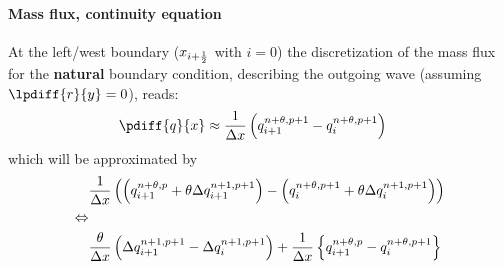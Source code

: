 \paragraph*{Mass flux, continuity equation}
At the left/west boundary ($x_{i+\frac{1}{2}}$ with $i=0$) the discretization of the mass flux for the \textbf{natural} boundary condition, describing the outgoing wave (assuming $\lpdiff{r}{y} = 0$), reads:
\begin{align}
    \pdiff{q}{x} & \approx \frac{1}{\Dx} \left(  q^{n+\theta, p+1}_{i+1} - q^{n+\theta, p+1}_{i} \right)
\end{align}
which will be approximated by
\begin{align}
    &\frac{1}{\Delta x} \left( \left( q^{n+\theta, p}_{i+1} + \theta \Delta q^{n+1, p+1}_{i+1}\right)
    - \left( q^{n+\theta, p+1}_{i} + \theta \Delta q^{n+1, p+1}_{i}\right) \right)
    \\
    \Leftrightarrow &
    \\
    &\frac{\theta }{\Delta x} \left( \Delta q^{n+1, p+1}_{i+1} - \Delta q^{n+1, p+1}_{i}\right) +
    \frac{1}{\Delta x} \left\{ q^{n+\theta, p}_{i+1} - q^{n+\theta, p+1}_{i} \right\}
\end{align}
